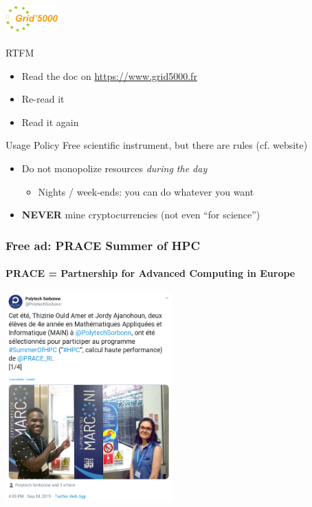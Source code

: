 \documentclass[10pt]{beamer}
\begin{document}

\begin{frame}[label=tme]
  \frametitle{\includegraphics[height=1cm]{grid5000_logo.png}}

  \begin{exampleblock}{RTFM}
    \begin{itemize}
    \item Read the doc on \url{https://www.grid5000.fr}
    \item Re-read it
    \item Read it again
    \end{itemize}
  \end{exampleblock}
  
  \medskip

  \begin{alertblock}{Usage Policy}
    Free scientific instrument, but there are rules (cf. website)
    \begin{itemize}
    \item Do not monopolize resources \emph{during the day}
      \begin{itemize}
      \item Nights / week-ends: you can do whatever you want
      \end{itemize}
    \item \textbf{NEVER} mine cryptocurrencies (not even ``for science'')
    \end{itemize}
  \end{alertblock}
  
\end{frame}


 \begin{frame}
   \frametitle{Free ad: PRACE Summer of HPC}
   \framesubtitle{PRACE = Partnership for Advanced Computing in Europe}
   \centering
   \includegraphics[height=8cm]{PRACE_twitter.png}
 \end{frame}
\end{document}
